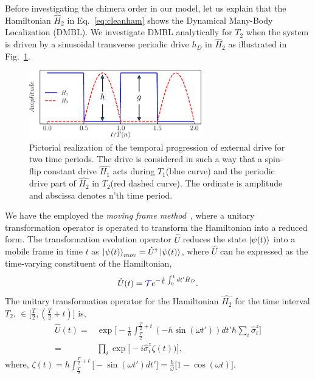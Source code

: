 \documentclass[%
reprint,
superscriptaddress,
amsmath,amssymb,showkeys,
aps,
prb,
]{revtex4-2}
\newcommand{\blue}[1]{\textcolor{blue}{#1}}
\begin{document}
	Before investigating the chimera order in our model, let us explain that the Hamiltonian $\hat{H}_2$ in Eq.~\eqref{eq:cleanham} shows the Dynamical Many-Body Localization (DMBL). We investigate DMBL analytically for $T_2$  when the system is driven by a sinusoidal transverse periodic drive $h_D$ in $\hat{H}_2$ as illustrated in Fig.~\ref{Fig:time_distribution}.
	\begin{figure}
		\begin{center}
			\includegraphics[width=7.5cm]{drive_distribution.pdf}
		\end{center}
		\caption[]{Pictorial realization of the temporal progression of external drive for two time periods. The drive is considered in such a way that a spin-flip constant drive $\hat{H_1}$ acts during $T_1$(blue curve) and the periodic drive part of $\hat{H_2}$ in $T_2$(red dashed curve). The ordinate is amplitude and abscissa denotes n'th time period.}
		\label{Fig:time_distribution}
	\end{figure}	
	We have the employed the \textit{moving frame method}~\cite{haldar_dynamical_2021}, where a unitary transformation operator is operated to transform the Hamiltonian into a reduced form. The transformation evolution operator $\hat{U}$ reduces the state $\ket{\psi(t)}$ into a mobile frame in time $t$ as $\ket{\psi(t)}_{mov} = \hat{U}^\dagger \ket{\psi(t)}$, where $\hat{U}$ can be expressed as the time-varying constituent of the Hamiltonian,
	\begin{equation}
		\hat{U}(t) = \blue{\mathcal{T}} e^{-\frac{i}{\hbar}\int_{0}^{t} dt' \hat{H}_D}.
		\label{eq:rot1}
	\end{equation}
	The unitary transformation operator for the Hamiltonian $\hat{H_2}$ for the time interval $T_2$, $\in{\Big[\frac{T}{2}, (\frac{T}{2}+t) \Big]}$ is,
	\begin{align}
		\hat{U}(t) =& \exp \Bigg[-\frac{i}{\hbar}\int_{\frac{T}{2}}^{\frac{T}{2}+t} (-h \sin(\omega t'))dt'\hbar\sum_i\hat{\sigma}^z_i\Bigg]\nonumber\\
		=& \prod_{i} \exp\Big[-i \hat{\sigma}^z_i\zeta(t))\Big],
	\end{align}	
	where, $\displaystyle{
		\zeta (t) = h\int_{\frac{T}{2}}^{\frac{T}{2}+t}  \Big[-\sin(\omega t')dt'\Big]=  \frac{h}{\omega}\Big[1-\cos(\omega t)\Big]}$.		
\end{document}

